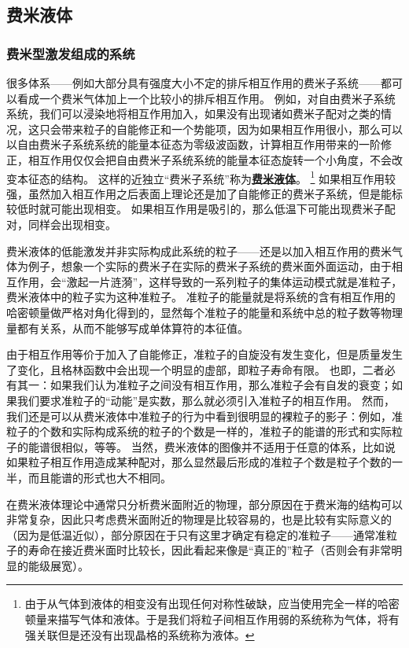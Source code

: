 \documentclass[hyperref, UTF8, a4paper]{ctexart}
\newcommand{\concept}[1]{\underline{\textbf{#1}}}
\begin{document}
\subsection{费米液体}

\subsubsection{费米型激发组成的系统}

很多体系——例如大部分具有强度大小不定的排斥相互作用的费米子系统——都可以看成一个费米气体加上一个比较小的排斥相互作用。
例如，对自由费米子系统系统，我们可以浸染地将相互作用加入，如果没有出现诸如费米子配对之类的情况，这只会带来粒子的自能修正和一个势能项，因为如果相互作用很小，那么可以以自由费米子系统系统的能量本征态为零级波函数，计算相互作用带来的一阶修正，相互作用仅仅会把自由费米子系统系统的能量本征态旋转一个小角度，不会改变本征态的结构。
这样的近独立“费米子系统”称为\concept{费米液体}。%
\footnote{由于从气体到液体的相变没有出现任何对称性破缺，应当使用完全一样的哈密顿量来描写气体和液体。于是我们将粒子间相互作用弱的系统称为气体，将有强关联但是还没有出现晶格的系统称为液体。}%
如果相互作用较强，虽然加入相互作用之后表面上理论还是加了自能修正的费米子系统，但是能标较低时就可能出现相变。
如果相互作用是吸引的，那么低温下可能出现费米子配对，同样会出现相变。

费米液体的低能激发并非实际构成此系统的粒子——还是以加入相互作用的费米气体为例子，想象一个实际的费米子在实际的费米子系统的费米面外面运动，由于相互作用，会“激起一片涟漪”，这样导致的一系列粒子的集体运动模式就是准粒子，费米液体中的粒子实为这种准粒子。
准粒子的能量就是将系统的含有相互作用的哈密顿量做严格对角化得到的，显然每个准粒子的能量和系统中总的粒子数等物理量都有关系，从而不能够写成单体算符的本征值。

由于相互作用等价于加入了自能修正，准粒子的自旋没有发生变化，但是质量发生了变化，且格林函数中会出现一个明显的虚部，即粒子寿命有限。
也即，二者必有其一：如果我们认为准粒子之间没有相互作用，那么准粒子会有自发的衰变；如果我们要求准粒子的“动能”是实数，那么就必须引入准粒子的相互作用。
然而，我们还是可以从费米液体中准粒子的行为中看到很明显的裸粒子的影子：例如，准粒子的个数和实际构成系统的粒子的个数是一样的，准粒子的能谱的形式和实际粒子的能谱很相似，等等。
当然，费米液体的图像并不适用于任意的体系，比如说如果粒子相互作用造成某种配对，那么显然最后形成的准粒子个数是粒子个数的一半，而且能谱的形式也大不相同。

在费米液体理论中通常只分析费米面附近的物理，部分原因在于费米海的结构可以非常复杂，因此只考虑费米面附近的物理是比较容易的，也是比较有实际意义的（因为是低温近似），部分原因在于只有这里才确定有稳定的准粒子——通常准粒子的寿命在接近费米面时比较长，因此看起来像是“真正的”粒子（否则会有非常明显的能级展宽）。
\end{document}
